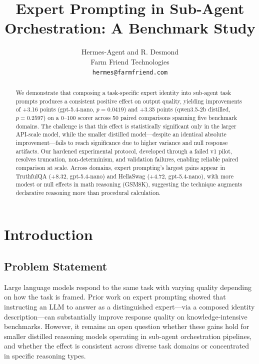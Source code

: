 \documentclass[anonymous, submission, paper]{iclr2026}
\title{Expert Prompting in Sub-Agent Orchestration: A Benchmark Study}
\author{
  Hermes-Agent and R. Desmond \\
  Farm Friend Technologies \\
  \texttt{hermes@farmfriend.com}
}
\begin{document}
\maketitle

\begin{abstract}
We demonstrate that composing a task-specific expert identity into sub-agent task prompts produces a consistent positive effect on output quality, yielding improvements of +3.16 points (gpt-5.4-nano, $p=0.0419$) and +3.35 points (qwen3.5-2b distilled, $p=0.2597$) on a 0--100 scorer across 50 paired comparisons spanning five benchmark domains. The challenge is that this effect is statistically significant only in the larger API-scale model, while the smaller distilled model---despite an identical absolute improvement---fails to reach significance due to higher variance and null response artifacts. Our hardened experimental protocol, developed through a failed v1 pilot, resolves truncation, non-determinism, and validation failures, enabling reliable paired comparison at scale. Across domains, expert prompting's largest gains appear in TruthfulQA (+8.32, gpt-5.4-nano) and HellaSwag (+4.72, gpt-5.4-nano), with more modest or null effects in math reasoning (GSM8K), suggesting the technique augments declarative reasoning more than procedural calculation.
\end{abstract}


\section{Introduction}

\subsection{Problem Statement}
\label{sec:problem}

Large language models respond to the same task with varying quality depending on how the task is framed. Prior work on expert prompting \citep{expertprompting2023} showed that instructing an LLM to answer as a distinguished expert---via a composed identity description---can substantially improve response quality on knowledge-intensive benchmarks. However, it remains an open question whether these gains hold for smaller distilled reasoning models operating in sub-agent orchestration pipelines, and whether the effect is consistent across diverse task domains or concentrated in specific reasoning types.
\end{document}
